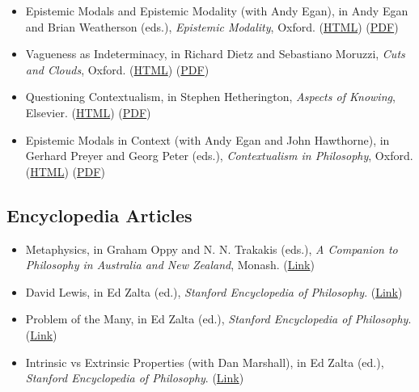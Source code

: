 \documentclass[
  10pt,
  letterpaper,
  DIV=11,
  numbers=noendperiod,
  twoside]{scrartcl}
\providecommand{\tightlist}{%
  \setlength{\itemsep}{0pt}\setlength{\parskip}{0pt}}\usepackage{longtable,booktabs,array}
\begin{document}
\begin{itemize}
\item
  Epistemic Modals and Epistemic Modality (with Andy Egan), in Andy Egan
  and Brian Weatherson (eds.), \emph{Epistemic Modality}, Oxford.
  (\href{./posts/epistemic-modals/epistemic-modals-and-epistemic-modality.html}{HTML})
  (\href{./posts/epistemic-modals/Epistemic\%20Modals\%20and\%20Epistemic\%20Modality.pdf}{PDF})
\item
  Vagueness as Indeterminacy, in Richard Dietz and Sebastiano Moruzzi,
  \emph{Cuts and Clouds}, Oxford.
  (\href{./posts/vai/vagueness-as-indeterminacy.html}{HTML})
  (\href{./posts/vai/Vagueness\%20as\%20Indeterminacy.pdf}{PDF})
\item
  Questioning Contextualism, in Stephen Hetherington, \emph{Aspects of
  Knowing}, Elsevier.
  (\href{./posts/qc/questioning-contextualism.html}{HTML})
  (\href{./posts/qc/Questioning\%20Contextualism.pdf}{PDF})
\item
  Epistemic Modals in Context (with Andy Egan and John Hawthorne), in
  Gerhard Preyer and Georg Peter (eds.), \emph{Contextualism in
  Philosophy}, Oxford.
  (\href{./posts/epic/epistemic-modals-in-context.html}{HTML})
  (\href{./posts/epic/Epistemic\%20Modals\%20in\%20Context.pdf}{PDF})
\end{itemize}

\subsection{Encyclopedia Articles}\label{encyclopedia-articles}

\begin{itemize}
\tightlist
\item
  Metaphysics, in Graham Oppy and N. N. Trakakis (eds.), \emph{A
  Companion to Philosophy in Australia and New Zealand}, Monash.
  (\href{http://www.publishing.monash.edu/cpanz/}{Link})
\item
  David Lewis, in Ed Zalta (ed.), \emph{Stanford Encyclopedia of
  Philosophy}.
  (\href{http://plato.stanford.edu/entries/david-lewis/}{Link})
\item
  Problem of the Many, in Ed Zalta (ed.), \emph{Stanford Encyclopedia of
  Philosophy}.
  (\href{http://plato.stanford.edu/entries/problem-of-many/}{Link})
\item
  Intrinsic vs Extrinsic Properties (with Dan Marshall), in Ed Zalta
  (ed.), \emph{Stanford Encyclopedia of Philosophy}.
  (\href{http://plato.stanford.edu/entries/intrinsic-extrinsic/}{Link})
\end{itemize}
\end{document}
